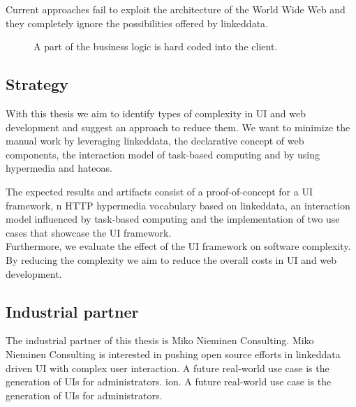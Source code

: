 Current approaches fail to exploit the architecture of the World Wide Web and they completely ignore the possibilities offered by \gls{linkeddata}.

\begin{figure}[!htb]
  \caption{A part of the business logic is hard coded into the client.}
  \label{fig:hardcoded}
\end{figure}

\subsection{Strategy}\label{strategy}
With this thesis we aim to identify types of complexity in UI and web development and suggest an approach to reduce them.
We want to minimize the manual work by leveraging \gls{linkeddata}, the declarative concept of web components, the interaction model of task-based computing and by using \gls{hypermedia} and \gls{hateoas}.

The expected results and artifacts consist of a proof-of-concept for a UI framework, n HTTP \gls{hypermedia} vocabulary based on \gls{linkeddata}, an interaction model influenced by task-based computing and the implementation of two use cases that showcase the UI framework. \\
Furthermore, we evaluate the effect of the UI framework on software complexity. By reducing the complexity we aim to reduce the overall costs in UI and web development.

\subsection{Industrial partner}
The industrial partner of this thesis is Miko Nieminen Consulting. Miko Nieminen Consulting is interested in pushing open source efforts in \gls{linkeddata} driven UI with complex user interaction. A future real-world use case is the generation of UIs for administrators.
ion. A future real-world use case is the generation of UIs for administrators.
